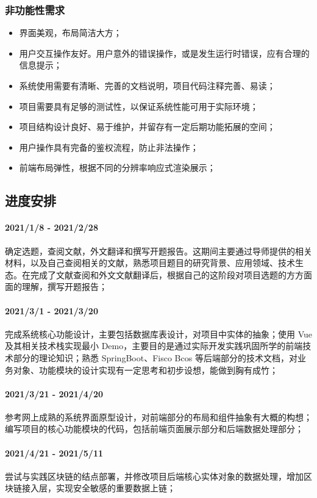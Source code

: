 \subsubsection{非功能性需求}
\begin{itemize}
    \item 界面美观，布局简洁大方；
    \item 用户交互操作友好。用户意外的错误操作，或是发生运行时错误，应有合理的信息提示；
    \item 系统使用需要有清晰、完善的文档说明，项目代码注释完善、易读；
    \item 项目需要具有足够的测试性，以保证系统性能可用于实际环境；
    \item 项目结构设计良好、易于维护，并留存有一定后期功能拓展的空间；
    \item 用户操作具有完备的鉴权流程，防止非法操作；
    \item 前端布局弹性，根据不同的分辨率响应式渲染展示；
\end{itemize}


\subsection{进度安排}
\paragraph{2021/1/8 - 2021/2/28} 确定选题，查阅文献，外文翻译和撰写开题报告。这期间主要通过导师提供的相关材料，以及自己查阅相关的文献，熟悉项目题目的研究背景、应用领域、技术生态。在完成了文献查阅和外文文献翻译后，根据自己的这阶段对项目选题的方方面面的理解，撰写开题报告；
\paragraph{2021/3/1 - 2021/3/20} 完成系统核心功能设计，主要包括数据库表设计，对项目中实体的抽象；使用 Vue 及其相关技术栈实现最小 Demo，主要目的是通过实际开发实践巩固所学的前端技术部分的理论知识；熟悉 SpringBoot、Fisco Bcos 等后端部分的技术文档，对业务对象、功能模块的设计实现有一定思考和初步设想，能做到胸有成竹；
\paragraph{2021/3/21 - 2021/4/20} 参考网上成熟的系统界面原型设计，对前端部分的布局和组件抽象有大概的构想；编写项目的核心功能模块的代码，包括前端页面展示部分和后端数据处理部分；
\paragraph{2021/4/21 - 2021/5/11} 尝试与实践区块链的结点部署，并修改项目后端核心实体对象的数据处理，增加区块链接入层，实现安全敏感的重要数据上链；
